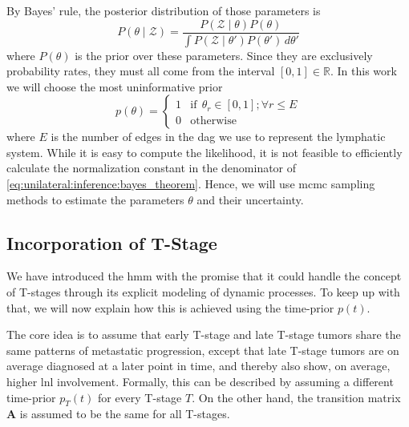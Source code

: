 \documentclass[\relativeRoot/main.tex]{subfiles}
\begin{document}
By Bayes' rule, the posterior distribution of those parameters is 
%
\begin{equation} \label{eq:unilateral:inference:bayes_theorem}
    P \left( \theta \mid \boldsymbol{\mathcal{Z}} \right) = \frac{P \left( \boldsymbol{\mathcal{Z}} \mid \theta \right) P\left( \theta \right)}{\int{P \left( \boldsymbol{\mathcal{Z}} \mid \theta' \right) P \left( \theta' \right) \,d\theta'}}
\end{equation}
%
where $P(\theta)$ is the prior over these parameters. Since they are exclusively probability rates, they must all come from the interval $[0,1] \in \mathbb{R}$. In this work we will choose the most uninformative prior
%
\begin{equation}
    p(\theta) = 
    \begin{cases}
        1 & \text{if} \ \ \theta_r \in \left[ 0,1 \right]; \forall r \leq E \\
        0 & \text{otherwise}
    \end{cases}
\end{equation}
%
where $E$ is the number of edges in the \gls{dag} we use to represent the lymphatic system. While it is easy to compute the likelihood, it is not feasible to efficiently calculate the normalization constant in the denominator of \cref{eq:unilateral:inference:bayes_theorem}. Hence, we will use \gls{mcmc} sampling methods to estimate the parameters $\theta$ and their uncertainty.

\subsection{Incorporation of T-Stage}
\label{subsec:unilateral:formalism:tstage}

We have introduced the \gls{hmm} with the promise that it could handle the concept of T-stages through its explicit modeling of dynamic processes. To keep up with that, we will now explain how this is achieved using the time-prior $p(t)$.

The core idea is to assume that early T-stage and late T-stage tumors share the same patterns of metastatic progression, except that late T-stage tumors are on average diagnosed at a later point in time, and thereby also show, on average, higher \gls{lnl} involvement. Formally, this can be described by assuming a different time-prior $p_T (t)$ for every T-stage $T$.  On the other hand, the transition matrix $\mathbf{A}$ is assumed to be the same for all T-stages.
\end{document}
